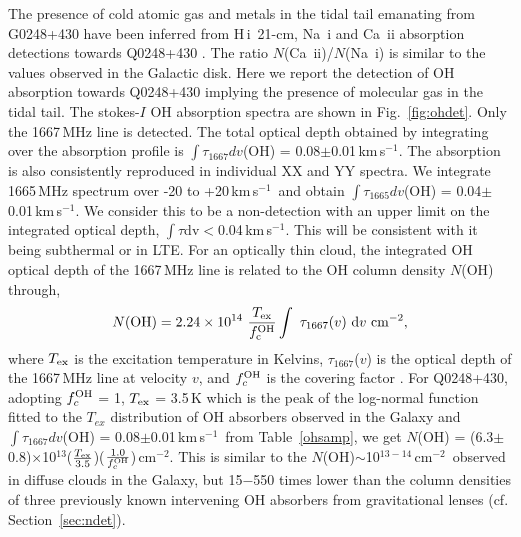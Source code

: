 \documentclass[iop,apjl,numberedappendix,appendixfloats,twocolappendix,revtex4]{emulateapj}
\newcommand{\hi}{\mbox{H\,{\sc i}}}
\newcommand{\kms}{km\,s$^{-1}$}
\newcommand{\cmsq}{cm$^{-2}$}
\begin{document}
The presence of cold atomic gas and metals in the tidal tail emanating from G0248+430 have been inferred from \hi\ 21-cm, Na~{\sc i} and Ca~{\sc ii} 
absorption detections towards Q0248+430 \citep[][]{Womble90, Hwang04}. The ratio $N$(Ca~{\sc ii})/$N$(Na~{\sc i}) is 
similar to the values observed in the Galactic disk.
Here we report the detection of OH absorption towards Q0248+430 implying the presence of molecular gas in the tidal tail.
The stokes-$I$ OH absorption spectra are shown in  Fig.~\ref{fig:ohdet}.  
Only the  1667\,MHz line is detected.  The total optical depth obtained by integrating over the absorption profile
is $\int\tau_{1667} dv$(OH) = 0.08$\pm$0.01\,\kms. 
The absorption is also consistently reproduced in individual XX and YY spectra. 
We integrate 1665\,MHz spectrum over -20 to +20\,\kms\ and obtain 
$\int\tau_{1665} dv$(OH) = 0.04$\pm$0.01\,\kms.  We consider this to be a non-detection with an upper limit on 
the integrated optical depth, $\int\tau$dv$<$0.04\,\kms. This will be consistent with it being subthermal or in LTE.
For an optically thin cloud, the integrated OH optical depth of the 1667\,MHz line is related to the OH column density $N$(OH) through,
\begin{equation}
N{({\rm OH})}=2.24\times10^{14}~{T_{\rm ex}\over f_{\rm c}^{\rm OH}}\int~\tau_{1667}(v)~{\rm d}v~{\rm cm^{-2}}, 
\label{eq1}
\end{equation}
where $T_{\rm ex}$ is the excitation temperature in Kelvins, $\tau_{1667}$($v$) is the optical depth of the 1667\,MHz line at velocity $v$, 
and $f_c^{\rm OH}$ is the covering factor \citep[e.g.][]{Liszt96}. 
For Q0248+430, adopting $f_c^{\rm OH}$ = 1, $T_{\rm ex}$ = 3.5\,K which is the peak of the log-normal function fitted to the 
$T_{ex}$ distribution of OH absorbers observed in the Galaxy \citep[][]{Li18} and 
$\int\tau_{1667} dv$(OH) = 0.08$\pm$0.01\,\kms\ from Table~\ref{ohsamp}, 
we get $N$(OH) = (6.3$\pm$0.8)$\times$10$^{13}$($\frac{T_{\rm ex}}{3.5}$)($\frac{1.0}{f_c^{\rm OH}}$)\,\cmsq.  This is similar to the $N$(OH)$\sim$10$^{13-14}$\,\cmsq\ 
observed in diffuse clouds in the Galaxy, 
but 15$-$550 times lower than the column densities of three previously known intervening OH absorbers from gravitational lenses (cf. Section~\ref{sec:ndet}).  
\end{document}
